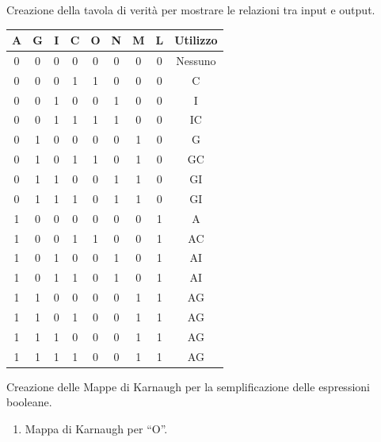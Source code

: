 \begin{questions}
\begin{solution}
\begin{table}[H]
			\label{tab:codifica}
		\end{table}
		
		\vspace{10em}

		\newpage
    
		
		Creazione della tavola di verità per mostrare le relazioni tra input e output.
        
        \begin{center}
			\begin{tabular}{cccc|cccc|c}
				A & G & I & C 	& O & N & M & L & Utilizzo\\
				\hline
				0 & 0 & 0 & 0 	& 0 & 0 & 0 & 0 & Nessuno\\
				0 & 0 & 0 & 1 	& 1 & 0 & 0 & 0 & C\\
				0 & 0 & 1 & 0 	& 0 & 1 & 0 & 0 & I\\
				0 & 0 & 1 & 1 	& 1 & 1 & 0 & 0 & IC\\
				0 & 1 & 0 & 0 	& 0 & 0 & 1 & 0 & G\\ 
				0 & 1 & 0 & 1 	& 1 & 0 & 1 & 0 & GC\\
				0 & 1 & 1 & 0 	& 0 & 1 & 1 & 0 & GI\\
				0 & 1 & 1 & 1 	& 0 & 1 & 1 & 0 & GI\\
				1 & 0 & 0 & 0 	& 0 & 0 & 0 & 1 & A\\
				1 & 0 & 0 & 1 	& 1 & 0 & 0 & 1 & AC\\
				1 & 0 & 1 & 0 	& 0 & 1 & 0 & 1 & AI\\
				1 & 0 & 1 & 1 	& 0 & 1 & 0 & 1 & AI\\
				1 & 1 & 0 & 0 	& 0 & 0 & 1 & 1 & AG\\
				1 & 1 & 0 & 1 	& 0 & 0 & 1 & 1 & AG\\
				1 & 1 & 1 & 0 	& 0 & 0 & 1 & 1 & AG\\
				1 & 1 & 1 & 1 	& 0 & 0 & 1 & 1 & AG\\
			\end{tabular}
        \end{center}
        
        \newpage
            
        
        Creazione delle Mappe di Karnaugh per la semplificazione delle espressioni booleane.
            
            \begin{enumerate}
                \item Mappa di Karnaugh per ``O''.
                

\end{enumerate}
\end{solution}
\end{questions}
